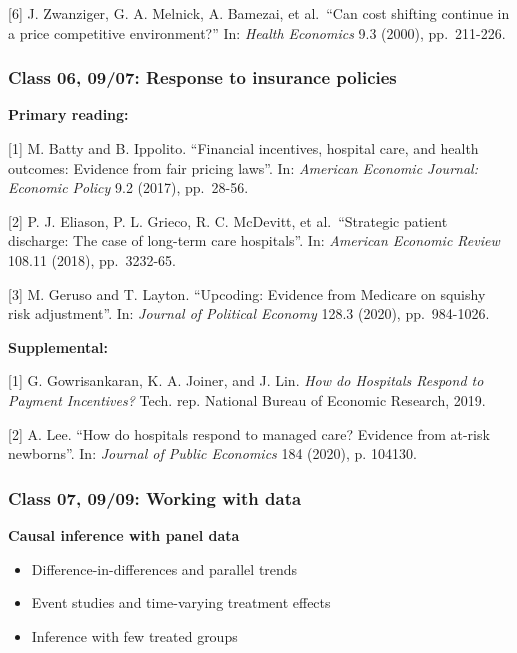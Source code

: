 \documentclass[11pt,]{article}
\providecommand{\tightlist}{%
  \setlength{\itemsep}{0pt}\setlength{\parskip}{0pt}}
\begin{document}
{[}6{]} J. Zwanziger, G. A. Melnick, A. Bamezai, et al.~``Can cost
shifting continue in a price competitive environment?'' In: \emph{Health
Economics} 9.3 (2000), pp.~211-226.

\hypertarget{class-06-0907-response-to-insurance-policies}{%
\subsubsection{Class 06, 09/07: Response to insurance
policies}\label{class-06-0907-response-to-insurance-policies}}

\textbf{Primary reading:}

{[}1{]} M. Batty and B. Ippolito. ``Financial incentives, hospital care,
and health outcomes: Evidence from fair pricing laws''. In:
\emph{American Economic Journal: Economic Policy} 9.2 (2017), pp.~28-56.

{[}2{]} P. J. Eliason, P. L. Grieco, R. C. McDevitt, et al.~``Strategic
patient discharge: The case of long-term care hospitals''. In:
\emph{American Economic Review} 108.11 (2018), pp.~3232-65.

{[}3{]} M. Geruso and T. Layton. ``Upcoding: Evidence from Medicare on
squishy risk adjustment''. In: \emph{Journal of Political Economy} 128.3
(2020), pp.~984-1026.

\textbf{Supplemental:}

{[}1{]} G. Gowrisankaran, K. A. Joiner, and J. Lin. \emph{How do
Hospitals Respond to Payment Incentives?} Tech. rep. National Bureau of
Economic Research, 2019.

{[}2{]} A. Lee. ``How do hospitals respond to managed care? Evidence
from at-risk newborns''. In: \emph{Journal of Public Economics} 184
(2020), p. 104130.

\hypertarget{class-07-0909-working-with-data}{%
\subsubsection{Class 07, 09/09: Working with
data}\label{class-07-0909-working-with-data}}

\textbf{Causal inference with panel data}

\begin{itemize}
\tightlist
\item
  Difference-in-differences and parallel trends
\item
  Event studies and time-varying treatment effects
\item
  Inference with few treated groups
\end{itemize}
\end{document}
